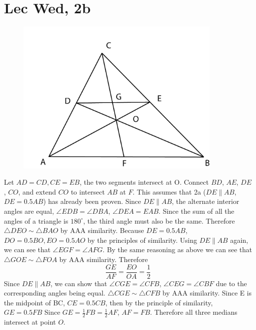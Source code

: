 \documentclass[12pt]{article}
\newcommand{\degrees}{^{\circ}}
\begin{document}
\section{Lec Wed, 2b}
\begin{figure}[h]
    \includegraphics[width = 100mm]{GRAPH3.png}
\end{figure}
Let $AD = CD, CE = EB$, the two segments intersect at O. Connect $BD$, $AE$, $DE$, $CO$, and extend $CO$ to intersect $AB$ at $F$.
\newline
This assumes that 2a ($DE \parallel AB$, $DE = 0.5AB$) has already been proven.
\newline
Since $DE \parallel AB$, the alternate interior angles are equal, $\angle EDB = \angle DBA$, $\angle DEA = EAB$. Since the sum of all the angles of a triangle is $180 \degrees$, the third angle must also be the same. Therefore $\triangle DEO \sim \triangle BAO$ by AAA similarity.
\newline
Because $DE = 0.5AB$, $DO = 0.5BO, EO = 0.5 AO$ by the principles of similarity.
\newline
Using $DE \parallel AB$ again, we can see that $\angle EGF = \angle AFG$. By the same reasoning as above we can see that $\triangle GOE \sim \triangle FOA$ by AAA similarity. Therefore $$\frac{GE}{AF} = \frac{EO}{OA} = \frac{1}{2}$$
Since $DE \parallel AB$, we can show that $\angle CGE = \angle CFB$, $\angle CEG = \angle CBF$ due to the corresponding angles being equal. $\triangle CGE \sim \triangle CFB$ by AAA similarity. Since E is the midpoint of BC, $CE = 0.5 CB$, then by the principle of similarity, $GE = 0.5FB$
\newline
Since $GE = \frac{1}{2}FB = \frac{1}{2}AF$, $AF = FB$. Therefore all three medians intersect at point $O$.
\newpage
\end{document}

